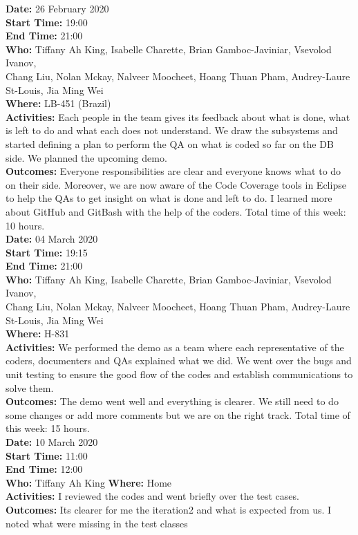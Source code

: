 \documentclass[12pt]{article}
\begin{document}
{\bf Date:} 26 February 2020\\
{\bf Start Time:} 19:00\\
{\bf End Time:} 21:00\\
{\bf Who:} Tiffany Ah King, Isabelle Charette, Brian Gamboc-Javiniar, Vsevolod Ivanov,\\
Chang Liu, Nolan Mckay, Nalveer Moocheet, Hoang Thuan Pham, Audrey-Laure St-Louis, Jia Ming Wei\\
{\bf Where:} LB-451 (Brazil)\\
{\bf Activities:} Each people in the team gives its feedback about what is done, what is left to do and what each does not understand. We draw the subsystems and started defining a plan to perform the QA on what is coded so far on the DB side. We planned the upcoming demo.\\
{\bf Outcomes:} Everyone responsibilities are clear and everyone knows what to do on their side. Moreover, we are now aware of the Code Coverage tools in Eclipse to help the QAs to get insight on what is done and left to do. I learned more about GitHub and GitBash with the help of the coders. Total time of this week: 10 hours.\\

{\bf Date:} 04 March 2020\\
{\bf Start Time:} 19:15\\
{\bf End Time:} 21:00\\
{\bf Who:} Tiffany Ah King, Isabelle Charette, Brian Gamboc-Javiniar, Vsevolod Ivanov,\\
Chang Liu, Nolan Mckay, Nalveer Moocheet, Hoang Thuan Pham, Audrey-Laure St-Louis, Jia Ming Wei\\
{\bf Where:} H-831\\
{\bf Activities:} We performed the demo as a team where each representative of the coders, documenters and QAs explained what we did. We went over the bugs and unit testing to ensure the good flow of the codes and establish communications to solve them.\\
{\bf Outcomes:} The demo went well and everything is clearer. We still need to do some changes or add more comments but we are on the right track.  Total time of this week: 15 hours.\\


{\bf Date:} 10 March 2020\\
{\bf Start Time:} 11:00 \\
{\bf End Time:} 12:00\\
{\bf Who:} Tiffany Ah King
{\bf Where:} Home\\
{\bf Activities:} I reviewed the codes and went briefly over the test cases. \\
{\bf Outcomes:} Its clearer for me the iteration2 and what is expected from us. I noted what were missing in the test classes\\

\end{document}

